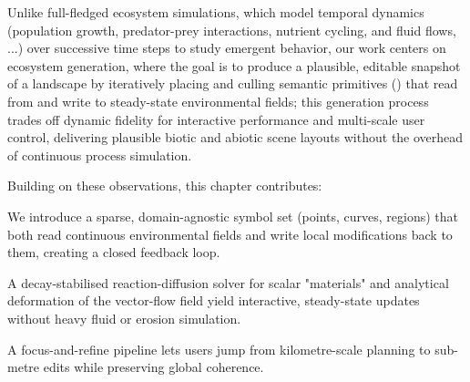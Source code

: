 Unlike full-fledged ecosystem simulations, which model temporal dynamics (population growth, predator-prey interactions, nutrient cycling, and fluid flows, ...) over successive time steps to study emergent behavior, our work centers on ecosystem generation, where the goal is to produce a plausible, editable snapshot of a landscape by iteratively placing and culling semantic primitives () that read from and write to steady-state environmental fields; this generation process trades off dynamic fidelity for interactive performance and multi-scale user control, delivering plausible biotic and abiotic scene layouts without the overhead of continuous process simulation.

Building on these observations, this chapter contributes:
\begin{Itemize}
\Item{}  We introduce a sparse, domain-agnostic symbol set (points, curves, regions) that both read continuous environmental fields and write local modifications back to them, creating a closed feedback loop.

\Item{}  A decay-stabilised reaction-diffusion solver for scalar "materials" and analytical deformation of the vector-flow field yield interactive, steady-state updates without heavy fluid or erosion simulation.

\Item{}  A focus-and-refine pipeline lets users jump from kilometre-scale planning to sub-metre edits while preserving global coherence. %

\end{Itemize}










